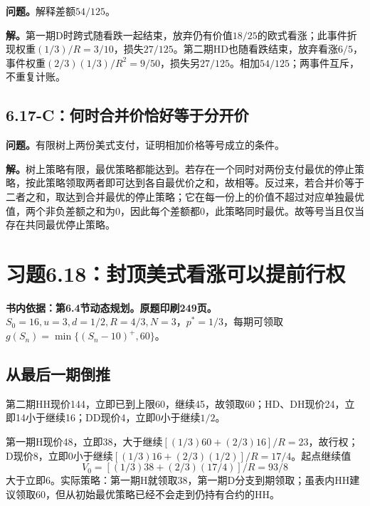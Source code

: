 \documentclass[11pt,a4paper,UTF8,fontset=fandol]{ctexart}
\begin{document}
\textbf{问题。}解释差额\(54/125\)。

\textbf{解。}第一期D时跨式随看跌一起结束，放弃仍有价值\(18/25\)的欧式看涨；此事件折现权重\((1/3)/R=3/10\)，损失\(27/125\)。第二期HD也随看跌结束，放弃看涨\(6/5\)，事件权重\((2/3)(1/3)/R^2=9/50\)，损失另\(27/125\)。相加\(54/125\)；两事件互斥，不重复计账。

\subsection{6.17-C：何时合并价恰好等于分开价}\label{cux4f55ux65f6ux5408ux5e76ux4ef7ux6070ux597dux7b49ux4e8eux5206ux5f00ux4ef7}

\textbf{问题。}有限树上两份美式支付，证明相加价格等号成立的条件。

\textbf{解。}树上策略有限，最优策略都能达到。若存在一个同时对两份支付最优的停止策略，按此策略领取两者即可达到各自最优价之和，故相等。反过来，若合并价等于二者之和，取达到合并最优的停止策略；它在每一份上的价值不超过对应单独最优值，两个非负差额之和为0，因此每个差额都0，此策略同时最优。故等号当且仅当存在共同最优停止策略。

\bigskip

\section{习题6.18：封顶美式看涨可以提前行权}\label{ux4e60ux98986.18ux5c01ux9876ux7f8eux5f0fux770bux6da8ux53efux4ee5ux63d0ux524dux884cux6743}

\textbf{书内依据：第6.4节动态规划。原题印刷249页。}\(S_0=16,u=3,d=1/2,R=4/3,N=3\)，\(p^*=1/3\)，每期可领取\(g(S_n)=\min\{(S_n-10)^+,60\}\)。

\subsection{从最后一期倒推}\label{ux4eceux6700ux540eux4e00ux671fux5012ux63a8}

第二期HH现价144，立即已到上限60，继续45，故领取60；HD、DH现价24，立即14小于继续16；DD现价4，立即0小于继续\(1/2\)。

第一期H现价48，立即38，大于继续\([(1/3)60+(2/3)16]/R=23\)，故行权；D现价8，立即0小于继续\([(1/3)16+(2/3)(1/2)]/R=17/4\)。起点继续值
\[\boxed{V_0=[(1/3)38+(2/3)(17/4)]/R=93/8}\]
大于立即6。实际策略：第一期H就领取38，第一期D分支到期领取；虽表内HH建议领取60，但从初始最优策略已经不会走到仍持有合约的HH。

\begingroup
\small
\setlength{\tabcolsep}{4pt}
\renewcommand{\arraystretch}{1.10}
\end{document}
